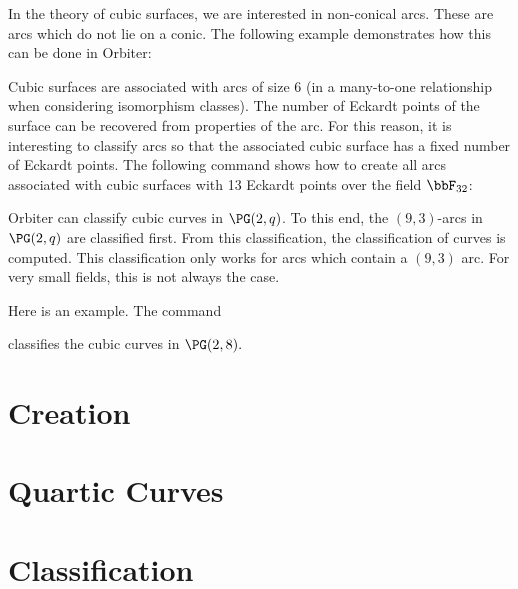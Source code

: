 \bigskip



\bigskip

In the theory of cubic surfaces, we are interested in non-conical arcs. 
These are arcs which do not lie on a conic.
The following example demonstrates how this can be done in Orbiter:
{\tt

}
Cubic surfaces are associated with arcs of size 6 
(in a many-to-one relationship when considering isomorphism classes).
The number of Eckardt points of the surface can be recovered from properties of the arc.
For this reason, it is interesting to classify arcs so that the associated 
cubic surface has a fixed number of Eckardt points.
The following command shows how to create all arcs associated 
with cubic surfaces with 13 Eckardt points over the field $\bbF_{32}$:
{\tt

}

Orbiter can classify cubic curves in $\PG(2,q)$. 
To this end, the $(9,3)$-arcs in $\PG(2,q)$ are classified first.
From this classification, the classification of curves is computed.
This classification only works for arcs which contain a $(9,3)$ arc. 
For very small fields, this is not always the case. 

Here is an example. The command  
{\tt

}
classifies the cubic curves in $\PG(2,8).$
\section{Creation}
\label{sec:cubicsurfaces:creation}




\bigskip

\clearpage


\section{Quartic Curves}
\label{sec:cubic:surfaces:quartic:curves}




\bigskip

\clearpage


\section{Classification}
\label{sec:cubicsurfaces:classification}




